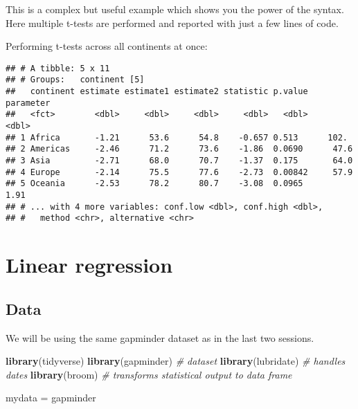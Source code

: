 \documentclass[]{book}
\makeatletter
\newenvironment{Shaded}{\begin{snugshade}}{\end{snugshade}}
\newcommand{\KeywordTok}[1]{\textcolor[rgb]{0.13,0.29,0.53}{\textbf{#1}}}
\newcommand{\DataTypeTok}[1]{\textcolor[rgb]{0.13,0.29,0.53}{#1}}
\newcommand{\DecValTok}[1]{\textcolor[rgb]{0.00,0.00,0.81}{#1}}
\newcommand{\StringTok}[1]{\textcolor[rgb]{0.31,0.60,0.02}{#1}}
\newcommand{\CommentTok}[1]{\textcolor[rgb]{0.56,0.35,0.01}{\textit{#1}}}
\newcommand{\OperatorTok}[1]{\textcolor[rgb]{0.81,0.36,0.00}{\textbf{#1}}}
\newcommand{\NormalTok}[1]{#1}
\newenvironment{kframe}{%
\medskip{}
\setlength{\fboxsep}{.8em}
 \def\at@end@of@kframe{}%
 \ifinner\ifhmode%
  \def\at@end@of@kframe{\end{minipage}}%
  \begin{minipage}{\columnwidth}%
 \fi\fi%
 \def\FrameCommand##1{\hskip\@totalleftmargin \hskip-\fboxsep
 \colorbox{shadecolor}{##1}\hskip-\fboxsep
     \hskip-\linewidth \hskip-\@totalleftmargin \hskip\columnwidth}%
 \MakeFramed {\advance\hsize-\width
   \@totalleftmargin\z@ \linewidth\hsize
   \@setminipage}}%
 {\par\unskip\endMakeFramed%
 \at@end@of@kframe}
\renewenvironment{Shaded}{\begin{kframe}}{\end{kframe}}
\theoremstyle{definition}
\theoremstyle{definition}
\theoremstyle{definition}
\theoremstyle{remark}
\makeatother
\begin{document}
This is a complex but useful example which shows you the power of the
syntax. Here multiple t-tests are performed and reported with just a few
lines of code.

Performing t-tests across all continents at once:

\begin{Shaded}
\end{Shaded}

\begin{verbatim}
## # A tibble: 5 x 11
## # Groups:   continent [5]
##   continent estimate estimate1 estimate2 statistic p.value parameter
##   <fct>        <dbl>     <dbl>     <dbl>     <dbl>   <dbl>     <dbl>
## 1 Africa       -1.21      53.6      54.8    -0.657 0.513      102.  
## 2 Americas     -2.46      71.2      73.6    -1.86  0.0690      47.6 
## 3 Asia         -2.71      68.0      70.7    -1.37  0.175       64.0 
## 4 Europe       -2.14      75.5      77.6    -2.73  0.00842     57.9 
## 5 Oceania      -2.53      78.2      80.7    -3.08  0.0965       1.91
## # ... with 4 more variables: conf.low <dbl>, conf.high <dbl>,
## #   method <chr>, alternative <chr>
\end{verbatim}

\chapter{Linear regression}\label{linear-regression}

\section{Data}\label{data-3}

We will be using the same gapminder dataset as in the last two sessions.

\begin{Shaded}
\begin{Highlighting}[]
\KeywordTok{library}\NormalTok{(tidyverse)}
\KeywordTok{library}\NormalTok{(gapminder) }\CommentTok{# dataset}
\KeywordTok{library}\NormalTok{(lubridate) }\CommentTok{# handles dates}
\KeywordTok{library}\NormalTok{(broom)     }\CommentTok{# transforms statistical output to data frame}

\NormalTok{mydata =}\StringTok{ }\NormalTok{gapminder}
\end{Highlighting}
\end{Shaded}
\end{document}
